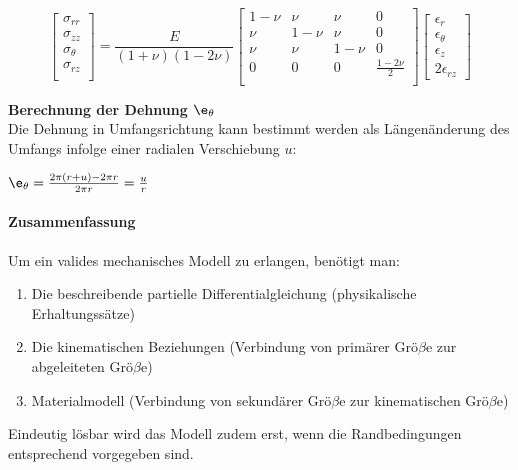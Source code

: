 \begin{equation}
\label{generalHookRotsym}
\begin{bmatrix} 
\sigma_{rr} \\
\sigma_{zz} \\
\sigma_{\theta} \\
\sigma_{rz} \\
\end{bmatrix} = \frac{E}{(1+\nu)(1-2\nu)}\begin{bmatrix}
1-\nu & \nu & \nu & 0  \\
\nu & 1-\nu & \nu & 0  \\
\nu & \nu & 1-\nu & 0  \\
0 & 0 & 0 & \frac{1-2\nu}{2} \\
\end{bmatrix} \begin{bmatrix} \epsilon_{r} \\ \epsilon_{\theta} \\ \epsilon_{z} \\ 2\epsilon_{rz}  \end{bmatrix}
\end{equation}

\begin{framed}
\textbf{Berechnung der Dehnung $\e_{\theta}$}\\
Die Dehnung in Umfangsrichtung kann bestimmt werden als Längenänderung des Umfangs infolge einer radialen Verschiebung $u$:

$\e_{\theta} = \frac{2 \pi (r+u) -2\pi r}{2\pi r} = \frac{u}{r}$
\end{framed}

\paragraph{Zusammenfassung}

Um ein valides mechanisches Modell zu erlangen, benötigt man:

\begin{enumerate}
\item Die beschreibende partielle Differentialgleichung (physikalische Erhaltungssätze)
\item Die kinematischen Beziehungen (Verbindung von primärer Grö$\beta$e zur abgeleiteten Grö$\beta$e)
\item Materialmodell (Verbindung von sekundärer Grö$\beta$e zur kinematischen Grö$\beta$e)
\end{enumerate}

Eindeutig lösbar wird das Modell zudem erst, wenn die Randbedingungen entsprechend vorgegeben sind.

